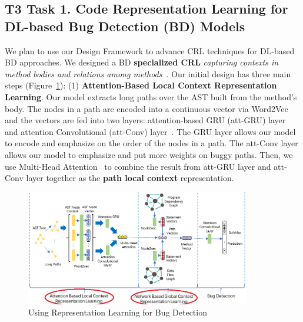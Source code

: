 \subsection{T3 Task 1. Code Representation Learning for DL-based Bug Detection (BD) Models}

We plan to use our Design Framework to advance CRL techniques
for DL-based BD approaches.
We designed a BD {\bf specialized CRL} {\em capturing contexts in
  method bodies and relations among methods}~\cite{yioopsla19}.  Our
initial design has three main steps (Figure~\ref{Fig.2}): (1)
\textbf{Attention-Based Local Context Representation Learning}.  
Our model extracts long paths over the AST built from the method's body.
The nodes in a path are encoded into a continuous vector via Word2Vec
and the vectors are fed into two layers: attention-based GRU (att-GRU)
layer~\cite{Cho-2014} and attention Convolutional (att-Conv)
layer~\cite{Yin-2016}. The GRU layer allows our model to encode and
emphasize on the order of the nodes in a path. The att-Conv layer
allows our model to emphasize and put more weights on buggy paths.
Then, we use Multi-Head Attention~\cite{Vaswani-2017} to combine the
result from att-GRU layer and att-Conv layer together as the
\textbf{path local context} representation.
%
\begin{figure}
	\vspace{-13pt}
	\centering
	\includegraphics[height = 1.98in]{graphs/Graph_2_trim.png}
	\vspace{-22pt}
	\caption{Using Representation Learning for Bug Detection}
	\label{Fig.2}
\end{figure}

